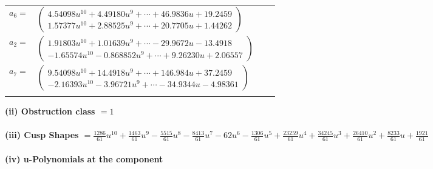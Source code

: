 \documentclass[1p]{elsarticle_modified}
\theoremstyle{definition}
\begin{document}
\begin{tabular}{m{7pt} m{180pt} m{7pt} m{180pt} }
\flushright $a_{6}=$&$\begin{pmatrix}4.54098 u^{10}+4.49180 u^{9}+\cdots+46.9836 u+19.2459\\1.57377 u^{10}+2.88525 u^{9}+\cdots+20.7705 u+1.44262\end{pmatrix}$ \\
\flushright $a_{2}=$&$\begin{pmatrix}1.91803 u^{10}+1.01639 u^{9}+\cdots-29.9672 u-13.4918\\-1.65574 u^{10}-0.868852 u^{9}+\cdots+9.26230 u+2.06557\end{pmatrix}$ \\
\flushright $a_{7}=$&$\begin{pmatrix}9.54098 u^{10}+14.4918 u^{9}+\cdots+146.984 u+37.2459\\-2.16393 u^{10}-3.96721 u^{9}+\cdots-34.9344 u-4.98361\end{pmatrix}$\\&\end{tabular}
\flushleft \textbf{(ii) Obstruction class $= 1$}\\~\\
\flushleft \textbf{(iii) Cusp Shapes $= \frac{1286}{61} u^{10}+\frac{1463}{61} u^9-\frac{5515}{61} u^8-\frac{8413}{61} u^7-62 u^6-\frac{1306}{61} u^5+\frac{23259}{61} u^4+\frac{34245}{61} u^3+\frac{26410}{61} u^2+\frac{8233}{61} u+\frac{1921}{61}$}\\~\\
\newpage\renewcommand{\arraystretch}{1}
\flushleft \textbf{(iv) u-Polynomials at the component}\newline \\
\end{document}
